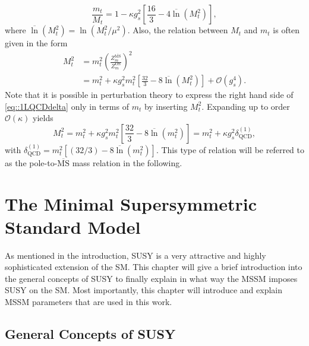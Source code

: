 \documentclass[a4paper,12pt]{book}
\begin{document}
\begin{equation}
\frac{m_t}{M_t} = 1 - \kappa g_s^2 \left[\frac{16}{3}-4 \overline{\ln}(M_t^2)\right],
\end{equation}
where $\overline{\ln}(M_t^2) = \ln \left(M_t^2/\mu^2\right)$. Also, the relation between $M_t$ and $m_t$ is often given in the form 
\begin{align}
M_t^2 &= m_t^2 \left(\frac{Z_m^{\overline{\text{MS}}}}{Z_m^\text{OS}}\right)^2\\
\label{eq::1LQCDdelta}
&=m_t^2 + \kappa g_s^2 m_t^2 \left[\frac{32}{3}-8 \overline{\ln}(M_t^2)\right]+\mathcal{O}(g_s^4).
\end{align}
Note that it is possible in perturbation theory to express the right hand side of \eqref{eq::1LQCDdelta} only in terms of $m_t$ by inserting $M_t^2$. Expanding up to order $\mathcal{O}(\kappa)$ yields
\begin{equation}
M_t^2 = m_t^2 + \kappa g_s^2 m_t^2 \left[\frac{32}{3}-8 \overline{\ln}(m_t^2)\right] = m_t^2 + \kappa g_s^2 \delta^{(1)}_\text{QCD},
\end{equation}
with $\delta^{(1)}_\text{QCD}=m_t^2 \left[(32/3)-8 \overline{\ln}(m_t^2)\right]$. This type of relation will be referred to as the pole-to-$\overline{\text{MS}}$ mass relation in the following. 
\chapter{The Minimal Supersymmetric Standard Model}
\label{chapter::MSSM}
As mentioned in the introduction, SUSY is a very attractive and highly sophisticated extension of the SM. This chapter will give a brief introduction into the general concepts of SUSY to finally explain in what way the MSSM imposes SUSY on the SM. Most importantly, this chapter will introduce and explain MSSM parameters that are used in this work. 
\section{General Concepts of SUSY}
\end{document}
